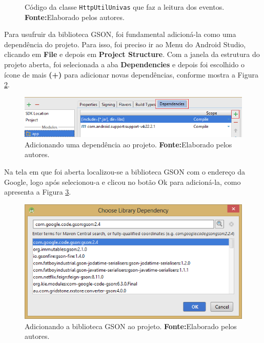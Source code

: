 	\begin{figure}[h!] 
		
		\caption[Código da classe HttpUtilUnivas que faz a leitura dos
		eventos]{Código da classe \texttt{HttpUtilUnivas} que faz a leitura dos
		eventos.
		\textbf{Fonte:}Elaborado pelos autores.}
		\label{fig:app8}
	\end{figure}
	
	\pagebreak
	
	\par Para usufruir da biblioteca GSON, foi fundamental adicioná-la como uma
dependência do projeto. Para isso, foi preciso ir ao Menu do Android Studio,
clicando em \textbf{File} e depois em \textbf{Project Structure}. Com a janela
da estrutura do projeto aberta, foi selecionada a aba \textbf{Dependencies} e
depois foi escolhido o ícone de mais \textbf{(+)} para adicionar novas
dependências, conforme mostra a Figura \ref{fig:app9}.
	
	\begin{figure}[h!] 
		\centerline{\includegraphics[scale=0.7]{./imagens/2_q_metodologico/4_procedimentos_resultados/42_aplicativo/app8.png}}
		\caption[Adicionando uma dependência ao projeto]{Adicionando uma dependência ao projeto.
		\textbf{Fonte:}Elaborado pelos autores.}
		\label{fig:app9}
	\end{figure}
	
	\par Na tela em que foi aberta localizou-se a biblioteca GSON com o endereço da
Google, logo após selecionou-a e clicou no botão Ok para adicioná-la, como
apresenta a Figura \ref{fig:app10}.
	
	\begin{figure}[h!] 
		\centerline{\includegraphics[scale=0.7]{./imagens/2_q_metodologico/4_procedimentos_resultados/42_aplicativo/app9.png}}
		\caption[Adicionando a biblioteca GSON ao projeto]{Adicionando a biblioteca GSON ao projeto.
		\textbf{Fonte:}Elaborado pelos autores.}
		\label{fig:app10}
	\end{figure}
	
